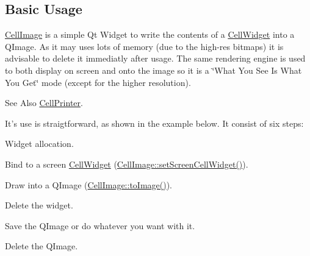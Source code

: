 \hypertarget{classHurricane_1_1CellImage_secImageBasicUsage}{}\subsection{Basic Usage}\label{classHurricane_1_1CellImage_secImageBasicUsage}
\hyperlink{classHurricane_1_1CellImage}{Cell\-Image} is a simple Qt Widget to write the contents of a \hyperlink{classHurricane_1_1CellWidget}{Cell\-Widget} into a Q\-Image. As it may uses lots of memory (due to the high-\/res bitmaps) it is advisable to delete it immediatly after usage. The same rendering engine is used to both display on screen and onto the image so it is a \char`\"{}\-What You
                   See Is What You Get\char`\"{} mode (except for the higher resolution).

\begin{DoxySeeAlso}{See Also}
\hyperlink{classHurricane_1_1CellPrinter}{Cell\-Printer}.
\end{DoxySeeAlso}
It's use is straigtforward, as shown in the example below. It consist of six steps\-: 
\begin{DoxyEnumerate}
\item Widget allocation. 
\item Bind to a screen \hyperlink{classHurricane_1_1CellWidget}{Cell\-Widget} (\hyperlink{classHurricane_1_1CellImage_a3e140125664a1088020d9bedc7de0f4e}{Cell\-Image\-::set\-Screen\-Cell\-Widget()}). 
\item Draw into a Q\-Image (\hyperlink{classHurricane_1_1CellImage_a90ed9b8a07f4302cbeecf52a95ef5578}{Cell\-Image\-::to\-Image()}). 
\item Delete the widget. 
\item Save the Q\-Image or do whatever you want with it. 
\item Delete the Q\-Image. 
\end{DoxyEnumerate}


